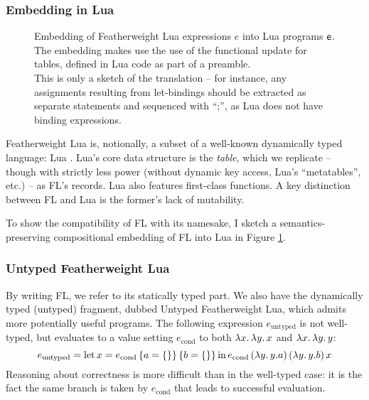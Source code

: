\subsubsection{Embedding in Lua}

\begin{figure}
    \centering
    
    \caption{Embedding of Featherweight Lua expressions $e$ into Lua programs $\textsf{e}$. The embedding makes use the use of the functional \textsf{update} for tables, defined in Lua code as part of a preamble. \\
    This is only a sketch of the translation -- for instance, any assignments resulting from let-bindings should be extracted as separate statements and sequenced with \enquote{;}, as Lua does not have binding expressions.}
    \label{fig:featherweight-lua-embedding}
\end{figure}

Featherweight Lua is, notionally, a subset of a well-known dynamically typed language: Lua \cite{lua54}.
Lua's core data structure is the \emph{table}, which we replicate -- though with strictly less power (without dynamic key access, Lua's \enquote{metatables}, etc.) -- as FL's records. 
Lua also features first-class functions.
A key distinction between FL and Lua is the former's lack of mutability. 

To show the compatibility of FL with its namesake, I sketch a semantics-preserving compositional embedding of FL into Lua in Figure \ref{fig:featherweight-lua-embedding}.

\subsubsection{Untyped Featherweight Lua}

By writing FL, we refer to its statically typed part. We also have the dynamically typed (untyped) fragment, dubbed Untyped Featherweight Lua, which admits more potentially useful programs. 
The following expression $e_\mathrm{untyped}$ is not well-typed, but evaluates to a value setting $e_\mathrm{cond}$ to both $\lambda {x} \ldotp \lambda {y} \ldotp x$ and $\lambda {x} \ldotp \lambda {y} \ldotp y$:
$$ e_\mathrm{untyped} = \fllet{x}{e_\mathrm{cond}\,\flrec{a=\flrec{}}\,\flrec{b=\flrec{}}} e_\mathrm{cond}\,(\fllam y \flproj{y}{a})\,(\fllam y y{.}b)\,x  $$
Reasoning about correctness is more difficult than in the well-typed case: it is the fact the same branch is taken by $e_\mathrm{cond}$ that leads to successful evaluation.

